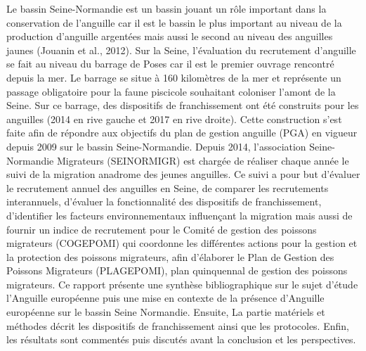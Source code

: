 \documentclass[11pt,titlepage,twoside]{article}\usepackage[]{graphicx}\usepackage[table]{xcolor}
\begin{document}
Le bassin Seine-Normandie est un bassin jouant un rôle important dans la conservation de l’anguille car il est le bassin le plus important au niveau de la production d’anguille argentées mais aussi le second au niveau des anguilles jaunes (Jouanin et al., 2012).
Sur la Seine, l’évaluation du recrutement d’anguille se fait au niveau du barrage de Poses car il est le premier ouvrage rencontré depuis la mer. Le barrage se situe à 160 kilomètres de la mer et représente un passage obligatoire pour la faune piscicole souhaitant coloniser l’amont de la Seine.
Sur ce barrage, des dispositifs de franchissement ont été construits pour les anguilles (2014 en rive gauche et 2017 en rive droite). Cette construction s’est faite afin de répondre aux objectifs du plan de gestion anguille (PGA) en vigueur depuis 2009 sur le bassin Seine-Normandie.
Depuis 2014, l’association Seine-Normandie Migrateurs (SEINORMIGR) est chargée de réaliser chaque année le suivi de la migration anadrome des jeunes anguilles. Ce suivi a pour but d’évaluer le recrutement annuel des anguilles en Seine, de comparer les recrutements interannuels, d’évaluer la fonctionnalité des dispositifs de franchissement, d’identifier les facteurs environnementaux influençant la migration mais aussi de fournir un indice de recrutement pour le Comité de gestion des poissons migrateurs (COGEPOMI) qui coordonne les différentes actions pour la gestion et la protection des poissons migrateurs, afin d’élaborer le Plan de Gestion des Poissons Migrateurs (PLAGEPOMI), plan quinquennal de gestion des poissons migrateurs.
Ce rapport présente une synthèse bibliographique sur le sujet d’étude \og l’Anguille européenne \fg{} puis une mise en contexte de la présence d’Anguille européenne sur le bassin Seine Normandie. Ensuite, La partie \og matériels et méthodes \fg{} décrit les dispositifs de franchissement ainsi que les protocoles. Enfin, les résultats sont commentés puis discutés avant la conclusion et les perspectives.





\normalsize
\null
\vfill
\end{document}
